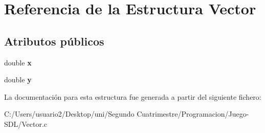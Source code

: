 \hypertarget{struct_vector}{}\section{Referencia de la Estructura Vector}
\label{struct_vector}
\subsection*{Atributos públicos}
\begin{DoxyCompactItemize}
\item 
double {\bfseries x}\hypertarget{struct_vector_a133722e00601091cb2075219da5da6e4}{}\label{struct_vector_a133722e00601091cb2075219da5da6e4}

\item 
double {\bfseries y}\hypertarget{struct_vector_a09a21a140718f234eea348d5058cee0b}{}\label{struct_vector_a09a21a140718f234eea348d5058cee0b}

\end{DoxyCompactItemize}


La documentación para esta estructura fue generada a partir del siguiente fichero\+:\begin{DoxyCompactItemize}
\item 
C\+:/\+Users/usuario2/\+Desktop/uni/\+Segundo Cuatrimestre/\+Programacion/\+Juego-\/\+S\+D\+L/Vector.\+c\end{DoxyCompactItemize}

